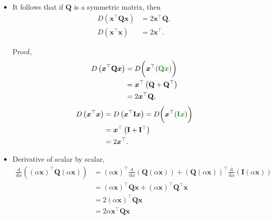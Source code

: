 \documentclass[12pt,thmsa]{article}
\begin{document}
\begin{itemize}
	\item It follows that if \(\boldsymbol{Q}\) is a symmetric matrix, then
	\[ \begin{aligned}
		D\left(\boldsymbol{x}^{\top} \boldsymbol{Q} \boldsymbol{x}\right) &=2 \boldsymbol{x}^{\top} \boldsymbol{Q}, \\
		D\left(\boldsymbol{x}^{\top} \boldsymbol{x}\right) &=2 \boldsymbol{x}^{\top}.
	\end{aligned}
	\]
	
	Proof,
	\[ \begin{aligned}    
		D\left(\boldsymbol{x}^{\top} \mathbf{Q} \boldsymbol{x}\right)    
		&=D \bigg( \boldsymbol{x}^{\top}( {\color{forestgreen}{\mathbf{Q} \boldsymbol{x}}} ) \bigg) \\
		&=\boldsymbol{x}^{\top} \left(\mathbf{Q}+\mathbf{Q}^{\top}\right) \\
		&=2 \boldsymbol{x}^{\top} \mathbf{Q},
	\end{aligned} \]
	\[ \begin{aligned}    
		D\left(\boldsymbol{x}^{\top}  \boldsymbol{x}\right)
		&=D\left(\boldsymbol{x}^{\top} \mathbf{I} \boldsymbol{x}\right) 
		=D \bigg( \boldsymbol{x}^{\top}( {\color{forestgreen}{\mathbf{I} \boldsymbol{x}}} ) \bigg) \\
		&=\boldsymbol{x}^{\top} \left(\mathbf{I}+\mathbf{I}^{\top}\right) \\
		&=2 \boldsymbol{x}^{\top}.
	\end{aligned} \]

	\item Derivative of scalar by scalar,
	\[\begin{aligned}
		\frac{\mathrm{d}}{\mathrm{d} \alpha}\left((\alpha \boldsymbol{x})^{\top} \mathbf{Q}(\alpha \boldsymbol{x})\right) 
		&=(\alpha \boldsymbol{x})^{\top} \frac{\mathrm{d}}{\mathrm{d} \alpha}(\mathbf{Q}(\alpha \boldsymbol{x}))
		+(\mathbf{Q}(\alpha \boldsymbol{x}))^{\top} \frac{\mathrm{d}}{\mathrm{d} \alpha}(\mathbf{I}(\alpha \boldsymbol{x})) \\
		& =(\alpha \boldsymbol{x})^{\top} \mathbf{Q} \boldsymbol{x}+(\alpha \boldsymbol{x})^{\top} \mathbf{Q}^{\top} \boldsymbol{x} \\
		& = 2 (\alpha \boldsymbol{x})^{\top} \mathbf{Q} \boldsymbol{x} \\
		& = 2 \alpha \boldsymbol{x}^{\top} \mathbf{Q} \boldsymbol{x} \\
	\end{aligned}
	\]
\end{itemize}
\end{document}
